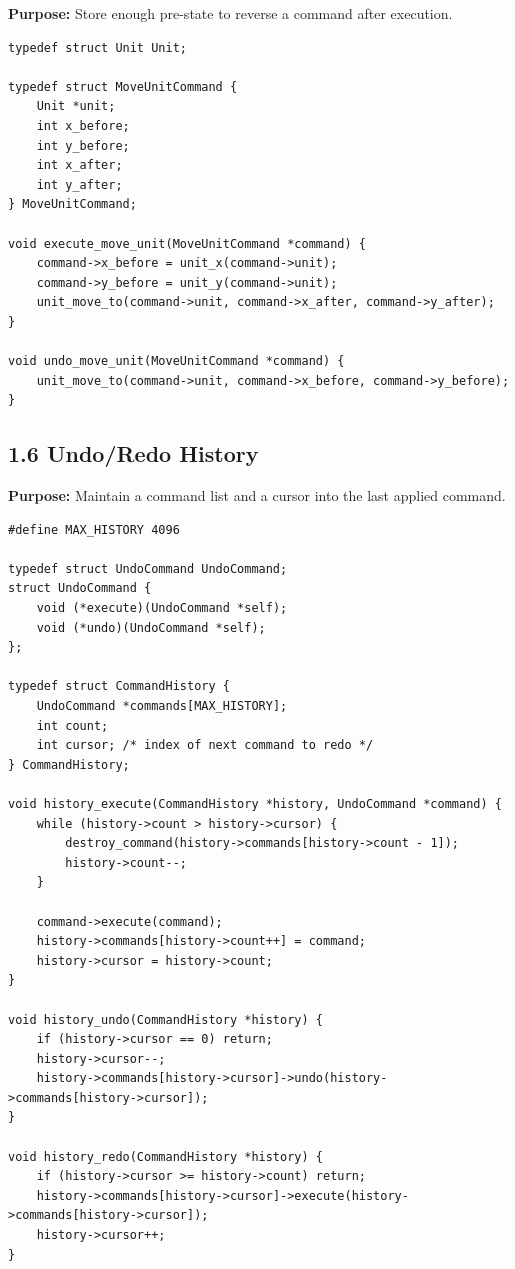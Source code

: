 \documentclass[10pt,letterpaper]{article}
\begin{document}
\textbf{Purpose:} Store enough pre-state to reverse a command after execution.

\begin{verbatim}
typedef struct Unit Unit;

typedef struct MoveUnitCommand {
    Unit *unit;
    int x_before;
    int y_before;
    int x_after;
    int y_after;
} MoveUnitCommand;

void execute_move_unit(MoveUnitCommand *command) {
    command->x_before = unit_x(command->unit);
    command->y_before = unit_y(command->unit);
    unit_move_to(command->unit, command->x_after, command->y_after);
}

void undo_move_unit(MoveUnitCommand *command) {
    unit_move_to(command->unit, command->x_before, command->y_before);
}
\end{verbatim}

\subsection{1.6 Undo/Redo History}

\textbf{Purpose:} Maintain a command list and a cursor into the last applied command.

\begin{verbatim}
#define MAX_HISTORY 4096

typedef struct UndoCommand UndoCommand;
struct UndoCommand {
    void (*execute)(UndoCommand *self);
    void (*undo)(UndoCommand *self);
};

typedef struct CommandHistory {
    UndoCommand *commands[MAX_HISTORY];
    int count;
    int cursor; /* index of next command to redo */
} CommandHistory;

void history_execute(CommandHistory *history, UndoCommand *command) {
    while (history->count > history->cursor) {
        destroy_command(history->commands[history->count - 1]);
        history->count--;
    }

    command->execute(command);
    history->commands[history->count++] = command;
    history->cursor = history->count;
}

void history_undo(CommandHistory *history) {
    if (history->cursor == 0) return;
    history->cursor--;
    history->commands[history->cursor]->undo(history->commands[history->cursor]);
}

void history_redo(CommandHistory *history) {
    if (history->cursor >= history->count) return;
    history->commands[history->cursor]->execute(history->commands[history->cursor]);
    history->cursor++;
}
\end{verbatim}
\end{document}
